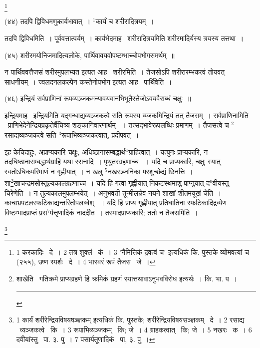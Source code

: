 \documentclass[11pt, openany]{book}
\newcommand\blfootnote[1]{%
 \begingroup
 \renewcommand\thefootnote{}\footnote{#1}%
 \addtocounter{footnote}{-1}%
 \endgroup
}
\begin{document}
\blfootnote{1 करकादिः  \textendash\ दे~। 2 तत्र शुक्लं  \textendash\ कं~। 3 'नैमित्तिकं द्रवत्वं च' इत्यधिकं कि. पुस्तके व्योमवत्यां च (२५५), उष्ण स्पर्शः  \textendash\ दे~। 4 भास्वरं रूपं तैजस  \textendash\ जे~।}

\newpage
\hangindent=2cm {\knu (४४) तदपि द्विविधमणुकार्यभावात्~। ${}^1$कार्यं च शरीरादित्रयम्~।}

{\knu तदपि द्विविध}मिति~। पूर्ववत्तात्पर्यम्~। कार्यभेदमाह \textendash\ {\knu शरीरादित्रय}मिति शरीरमादिर्यस्य त्रयस्य तत्तथा~।

\hangindent=2cm {\knu (४५) शरीरमयोनिजमादित्यलोके, पार्थिवावयवोपष्टम्भाच्चोपभोगसमर्थम्~॥}

न पार्थिववत्तैजसं शरीरमुपलभ्यत इत्यत आह \textendash\ {\knu शरीर}मिति~। तेजसोऽपि शरीरारम्भकत्वं तोयवत् साधनीयम्~। ज्वलदनलकल्पेन कस्तेनोपभोग इत्यत आह \textendash\ पार्थिवेति~।

\hangindent=2cm {\knu (४६) इन्द्रियं सर्वप्राणिनां रूपव्यञ्जकमन्यावयवानभिभूतैस्तेजोऽवयवैराब्धं चक्षुः~॥}

\begin{sloppypar}
इन्द्रियमाह \textendash\ {\knu इन्द्रिय}मिति यद्गन्धाद्यव्यञ्जकत्वे सति रूपस्य व्य्जकमिन्द्रियं तत् तैजसम्~। {\knu सर्वप्राणिनामिति} \textendash\ प्राणिभेदेनेन्द्रियप्रकृतेर्वैचित्र्य शङ्कानिवारणार्थम् ~। तत्सद्भावेरूपलब्धिः प्रमाणम्~। तैजसत्वे च ${}^2$रसाद्यव्यञ्जकत्वे सति ${}^3$रूपाभिव्यञ्जकत्वात्, प्रदीपवत्~।
\end{sloppypar}

इह केचिदाहुः, अप्राप्यकारि चक्षुः, अधिष्ठानासम्बद्धार्थ$^4$ग्राहित्वात्~। यत्पुनः प्राप्यकारि, न तदधिष्ठानासम्बद्धार्थग्राहि यथा रसनादि~। पृथुतरग्रहणाच्च ~। यदि च प्राप्यकारि, चक्षुः स्यात् स्वतोऽधिकपरिमाणं न गृह्णीयात्~। न खलु ${}^5$नखरञ्जनिका परशुच्छेद्यं छिनत्ति~। शा\renewcommand{\thefootnote}{१}\footnote{शाखेति \textendash\ गतिक्रमे प्राप्यग्रहणे हि क्रमिकं ग्रहणं स्यात्तथावाऽनुभवविरोध इत्यर्थः~। कि. भा. प~।\\ \rule{0.4\linewidth}{0.5pt}}खाचन्द्रमसोस्तुल्यकालग्रहणाच्च~। यदि हि गत्वा गृह्णीयात् निकटस्थमाशु प्राप्नुयात् द$^6$वीयस्तु चिरेणेति~। न तुल्यकालमुपलम्भयेत्~। अनुभवती तून्मीलन्नेव नयने शाखां शीतमयूखं चेति~। काचाभ्रपटलस्फटिकाद्यन्तरितोपलब्धेश् ~। यदि हि प्राप्य गृह्णीयात् प्रतिघातिना स्फटिकादिद्रव्येण विष्टम्भादप्राप्तं प्रस$^7$र्पत्तृणादिकं नाददीत~। तस्मादप्राप्यकारि; ततो न तैजसमिति~।

\blfootnote{1 कार्यं शरीरेन्द्रियविषयषञ्ज्ञकम् इत्यधिकं कि. पुस्तके; शरीरेन्द्रियविषयसञ्ज्ञकम्  \textendash\ दे~। 2 रसाद्य  \textendash\ व्यञ्जकत्वे  \textendash\ कि~। 3 रूपाभिव्यञ्जकम्  \textendash\ कि; जे~। 4 ग्राहकत्वात्  \textendash\ कि; जे~। 5 नखरः  \textendash\ क~। 6 दवीयांस्तु  \textendash\ पा. ३. पु~। 7 पसार्यतूणादिकं  \textendash\ पा, ३. पु~।}
\end{document}
